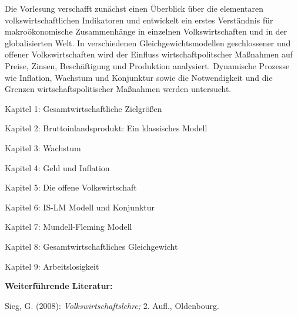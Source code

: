 \begin{course}
\begin{content}
Die Vorlesung verschafft zunächst einen Überblick über die elementaren volkswirtschaftlichen Indikatoren und entwickelt ein erstes Verständnis für makroökonomische Zusammenhänge in einzelnen Volkswirtschaften und in der globalisierten Welt. In verschiedenen Gleichgewichtsmodellen geschlossener und offener Volkswirtschaften wird der Einfluss wirtschaftpolitscher Maßnahmen auf Preise, Zinsen, Beschäftigung und Produktion analysiert. Dynamische Prozesse wie Inflation, Wachstum und Konjunktur sowie die Notwendigkeit und die Grenzen wirtschaftspolitischer Maßnahmen werden untersucht.

 

Kapitel 1: Gesamtwirtschaftliche Zielgrößen

 

Kapitel 2: Bruttoinlandsprodukt: Ein klassisches Modell

 

Kapitel 3: Wachstum

 

Kapitel 4: Geld und Inflation

 

Kapitel 5: Die offene Volkswirtschaft

 

Kapitel 6: IS-LM Modell und Konjunktur

 

Kapitel 7: Mundell-Fleming Modell

 

Kapitel 8: Gesamtwirtschaftliches Gleichgewicht

 

Kapitel 9: Arbeitslosigkeit


\end{content}



\begin{literature}\textbf{Weiterführende Literatur:}

 

Sieg, G. (2008): \emph{Volkswirtschaftslehre;} 2. Aufl., Oldenbourg.

\end{literature}



\end{course}
